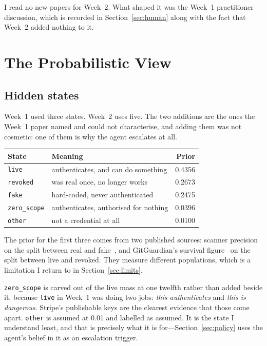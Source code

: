 \documentclass{article}
\begin{document}
I read no new papers for Week~2. What shaped it was the Week~1 practitioner
discussion, which is recorded in Section~\ref{sec:human} along with the fact
that Week~2 added nothing to it.

\section{The Probabilistic View}
\label{sec:prob}

\subsection{Hidden states}

Week~1 used three states. Week~2 uses five. The two additions are the ones the
Week~1 paper named and could not characterise, and adding them was not cosmetic:
one of them is why the agent escalates at all.

\begin{center}
\small
\begin{tabular}{@{}llr@{}}
\toprule
State & Meaning & Prior \\
\midrule
\texttt{live} & authenticates, and can do something & 0.4356 \\
\texttt{revoked} & was real once, no longer works & 0.2673 \\
\texttt{fake} & hard-coded, never authenticated & 0.2475 \\
\texttt{zero\_scope} & authenticates, authorised for nothing & 0.0396 \\
\texttt{other} & not a credential at all & 0.0100 \\
\bottomrule
\end{tabular}
\end{center}

The prior for the first three comes from two published sources: scanner precision
on the split between real and fake~\cite{basak2023comparative,alahmadi2022falsepositives},
and GitGuardian's survival figure~\cite{gitguardian2026} on the split between
live and revoked. They measure different populations, which is a limitation I
return to in Section~\ref{sec:limits}.

\texttt{zero\_scope} is carved out of the live mass at one twelfth rather than
added beside it, because \texttt{live} in Week~1 was doing two jobs: \emph{this
authenticates} and \emph{this is dangerous}. Stripe's publishable keys are the
clearest evidence that those come apart. \texttt{other} is assumed at 0.01 and
labelled as assumed. It is the state I understand least, and that is precisely
what it is for---Section~\ref{sec:policy} uses the agent's belief in it as an
escalation trigger.
\end{document}
